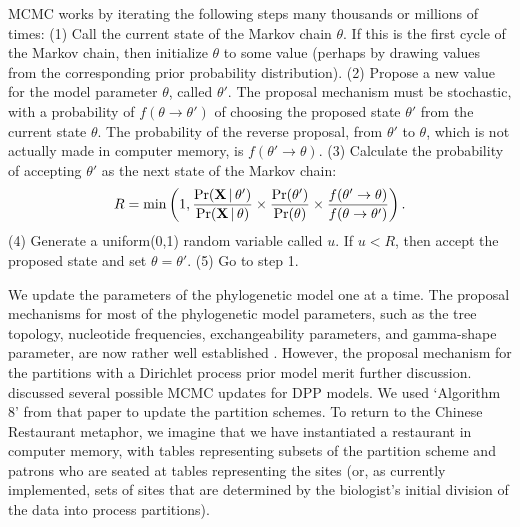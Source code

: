 \documentclass[11pt]{article}
\newcommand{\given}{\ensuremath{\,|\,}}
\begin{document}
MCMC works by iterating the following steps many thousands or millions of times: 
(1) Call the current state of the Markov chain $\theta$.
If this is the first cycle of the Markov chain, then initialize $\theta$ to some value (perhaps by drawing values from the corresponding prior probability distribution).
(2) Propose a new value for the model parameter $\theta$, called $\theta'$.
The proposal mechanism must be stochastic, with a probability of $f(\theta \rightarrow \theta')$ of choosing the proposed state $\theta'$ from the current state $\theta$.
The probability of the reverse proposal, from $\theta'$ to $\theta$, which is not actually made in computer memory, is $f(\theta' \rightarrow \theta)$. 
(3) Calculate the probability of accepting $\theta'$ as the next state of the Markov chain:
\begin{align} \label{eq:acceptance_prob}
R = \min \left(1, {\Pr(\mathbf{X} \given \theta') \over \Pr(\mathbf{X} \given \theta)} \times {\Pr(\theta') \over \Pr(\theta)} 
\times {f(\theta' \rightarrow \theta) \over f(\theta \rightarrow \theta')} \right).
\end{align}
(4) Generate a uniform(0,1) random variable called $u$. If $u < R$, then accept the proposed state and set $\theta = \theta'$. 
(5) Go to step 1.

We update the parameters of the phylogenetic model one at a time.
The proposal mechanisms for most of the phylogenetic model parameters, such as the tree topology, nucleotide frequencies, exchangeability parameters, and gamma-shape parameter, are now rather well established \citep[{\it e.g.},][]{larget99,holder05,lakner08}.
However, the proposal mechanism for the partitions with a Dirichlet process prior model merit further discussion.
\citet{neal00} discussed several possible MCMC updates for DPP models.
We used `Algorithm 8' from that paper to update the partition schemes. 
To return to the Chinese Restaurant metaphor, we imagine that we have instantiated a restaurant in computer memory, with tables
representing subsets of the partition scheme and patrons who are seated at tables representing the sites (or, as currently implemented, sets of sites that
are determined by the biologist's initial division of the data into process partitions).
\end{document}
